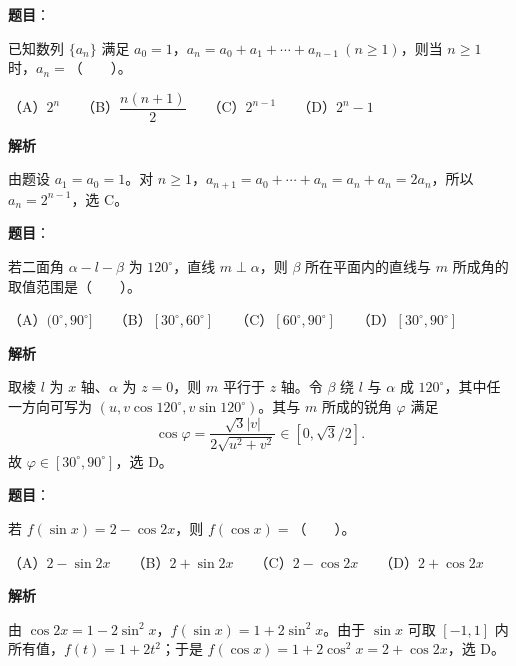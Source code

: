 \begin{answer}

\textbf{题目}：

已知数列 $\{a_n\}$ 满足 $a_0=1$，$a_n=a_0+a_1+\cdots+a_{n-1}\ (n\geq 1)$，则当 $n\geq 1$ 时，$a_n=$\mbox{（　　）}。

（A）$2^n$　　（B）$\dfrac{n(n+1)}{2}$　　（C）$2^{n-1}$　　（D）$2^n-1$

\textbf{解析}

由题设 $a_1=a_0=1$。对 $n\ge1$，$a_{n+1}=a_0+\cdots+a_n=a_n+a_n=2a_n$，所以 $a_n=2^{n-1}$，选 C。


\end{answer}
\begin{answer}

\textbf{题目}：

若二面角 $\alpha-l-\beta$ 为 $120^\circ$，直线 $m\perp\alpha$，则 $\beta$ 所在平面内的直线与 $m$ 所成角的取值范围是\mbox{（　　）}。

（A）$(0^\circ,90^\circ]$　　（B）$[30^\circ,60^\circ]$　　（C）$[60^\circ,90^\circ]$　　（D）$[30^\circ,90^\circ]$

\textbf{解析}

取棱 $l$ 为 $x$ 轴、$\alpha$ 为 $z=0$，则 $m$ 平行于 $z$ 轴。令 $\beta$ 绕 $l$ 与 $\alpha$ 成 $120^\circ$，其中任一方向可写为 $(u,v\cos120^\circ,v\sin120^\circ)$。其与 $m$ 所成的锐角 $\varphi$ 满足
\nopagebreak[4]
\[
\cos\varphi=\frac{\sqrt3|v|}{2\sqrt{u^2+v^2}}\in[0,\sqrt3/2].
\]
故 $\varphi\in[30^\circ,90^\circ]$，选 D。


\end{answer}
\begin{answer}

\textbf{题目}：

若 $f(\sin x)=2-\cos 2x$，则 $f(\cos x)=$\mbox{（　　）}。

（A）$2-\sin 2x$　　（B）$2+\sin 2x$　　（C）$2-\cos 2x$　　（D）$2+\cos 2x$

\textbf{解析}

由 $\cos2x=1-2\sin^2x$，$f(\sin x)=1+2\sin^2x$。由于 $\sin x$ 可取 $[-1,1]$ 内所有值，$f(t)=1+2t^2$；于是 $f(\cos x)=1+2\cos^2x=2+\cos2x$，选 D。


\end{answer}
